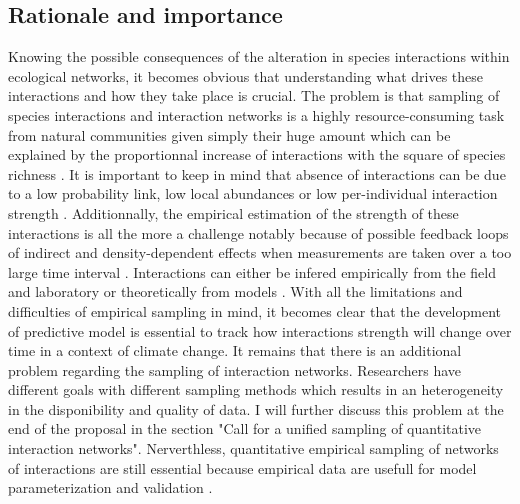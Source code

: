 \documentclass[english,12pt]{article}
\begin{document}
\subsection{Rationale and importance}
Knowing the possible consequences of the alteration in species interactions within ecological networks, it becomes obvious that understanding what drives these interactions and how they take place is crucial. The problem is that sampling of species interactions and interaction networks is a highly resource-consuming task from natural communities given simply their huge amount \citep{Jordano2016ChaEco,Hegland2010HowMon,Novak2008EstNon} which can be explained by the proportionnal increase of interactions with the square of species richness \cite{Gravel2016MeaFun}. It is important to keep in mind that absence of interactions can be due to a low probability link, low local abundances or low per-individual interaction strength \citep{Wells2013SpeInt}. Additionnally, the empirical estimation of the strength of these interactions is all the more a challenge \citep{Wootton1997EstTes,Sala2002ComDisc} notably because of possible feedback loops of indirect and density-dependent effects when measurements are taken over a too large time interval \citep{Wootton2005MeaInt}. Interactions can either be infered empirically from the field and laboratory or theoretically from models \citep{Morales-Castilla2015InfBio}. With all the limitations and difficulties of empirical sampling in mind, it becomes clear that the development of predictive model is essential to track how interactions strength will change over time in a context of climate change. It remains that there is an additional problem regarding the sampling of interaction networks. Researchers have different goals with different sampling methods \citep{Heleno2014EcoNet} which results in an heterogeneity in the disponibility and quality of data. I will further discuss this problem at the end of the proposal in the section "Call for a unified sampling of quantitative interaction networks". Nerverthless, quantitative empirical sampling of networks of interactions are still essential because empirical data are usefull for model parameterization and validation \citep{Novak2008EstNon}.\
\end{document}
